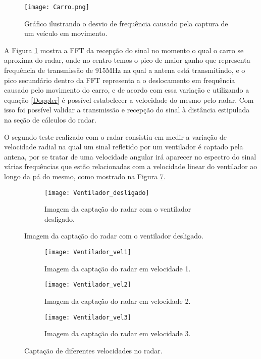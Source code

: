 \begin{figure}[H]
    \centering
    \texttt{[image: Carro.png]}
    \caption{Gráfico ilustrando o desvio de frequência causado pela captura de um veículo em movimento.}
    \label{TVeiculo}
\end{figure}

A Figura \ref{TVeiculo} mostra a FFT da recepção do sinal no momento o qual o carro se aproxima do radar,
onde no centro temos o pico de maior ganho que representa frequência de transmissão de 915MHz na qual a antena está transmitindo, e o pico secundário dentro da FFT representa a o deslocamento em frequência causado pelo movimento do carro, e de acordo com essa variação e utilizando a equação \ref{Doppler} é possível estabelecer a velocidade do mesmo pelo radar.
Com isso foi possível validar a transmissão e recepção do sinal à distância estipulada na seção de cálculos do radar. 

O segundo teste realizado com o radar consistiu em
medir a variação de velocidade radial na qual um sinal refletido por um ventilador é captado pela antena, por se tratar de uma velocidade angular irá aparecer no espectro do sinal várias frequências que estão relacionadas com a velocidade linear do ventilador ao longo da pá do mesmo, como mostrado na Figura \ref{fig:velocidade}.


\begin{figure}[H]

    \centering
      \begin{subfigure}{\textwidth}
        \texttt{[image: Ventilador\_desligado]}
    \caption{Imagem da captação do radar com o ventilador desligado.}
    \label{Vel0}
      \end{subfigure}


\end{figure}

\begin{figure}[H]\ContinuedFloat
    \centering
          \begin{subfigure}{\textwidth}
       \texttt{[image: Ventilador\_vel1]}
    \caption{Imagem da captação do radar em velocidade 1.}
    \label{Vel1}
      \end{subfigure}
      \begin{subfigure}{\textwidth}
        \texttt{[image: Ventilador\_vel2]}
    \caption{Imagem da captação do radar em velocidade 2.}
    \label{Vel2}
      \end{subfigure}
\begin{subfigure}{\textwidth}
       \texttt{[image: Ventilador\_vel3]}
    \caption{Imagem da captação do radar em velocidade 3.}
    \label{Vel3}
      \end{subfigure}
      \caption{Captação de diferentes velocidades no radar.}
      \label{fig:velocidade}
\end{figure}

